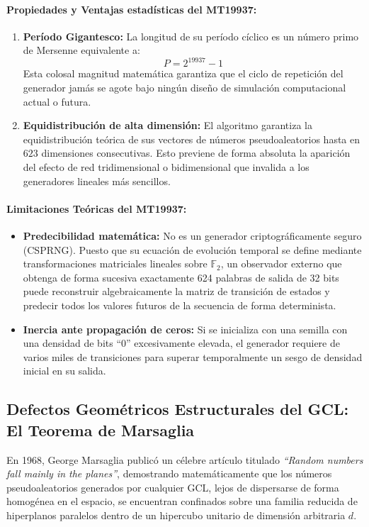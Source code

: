 \documentclass{article}
\begin{document}
\paragraph{Propiedades y Ventajas estadísticas del MT19937:}
\begin{enumerate}
    \item \textbf{Período Gigantesco:} La longitud de su período cíclico es un número primo de Mersenne equivalente a:
    \begin{equation}
        P = 2^{19937} - 1
    \end{equation}
    Esta colosal magnitud matemática garantiza que el ciclo de repetición del generador jamás se agote bajo ningún diseño de simulación computacional actual o futura.
    \item \textbf{Equidistribución de alta dimensión:} El algoritmo garantiza la equidistribución teórica de sus vectores de números pseudoaleatorios hasta en $623$ dimensiones consecutivas. Esto previene de forma absoluta la aparición del efecto de red tridimensional o bidimensional que invalida a los generadores lineales más sencillos.
\end{enumerate}

\paragraph{Limitaciones Teóricas del MT19937:}
\begin{itemize}
    \item \textbf{Predecibilidad matemática:} No es un generador criptográficamente seguro (CSPRNG). Puesto que su ecuación de evolución temporal se define mediante transformaciones matriciales lineales sobre $\mathbb{F}_2$, un observador externo que obtenga de forma sucesiva exactamente 624 palabras de salida de 32 bits puede reconstruir algebraicamente la matriz de transición de estados y predecir todos los valores futuros de la secuencia de forma determinista.
    \item \textbf{Inercia ante propagación de ceros:} Si se inicializa con una semilla con una densidad de bits ``0'' excesivamente elevada, el generador requiere de varios miles de transiciones para superar temporalmente un sesgo de densidad inicial en su salida.
\end{itemize}

\newpage

\subsection{Defectos Geométricos Estructurales del GCL: El Teorema de Marsaglia}
En 1968, George Marsaglia publicó un célebre artículo titulado \emph{``Random numbers fall mainly in the planes''}, demostrando matemáticamente que los números pseudoaleatorios generados por cualquier GCL, lejos de dispersarse de forma homogénea en el espacio, se encuentran confinados sobre una familia reducida de hiperplanos paralelos dentro de un hipercubo unitario de dimensión arbitraria $d$.
\end{document}
